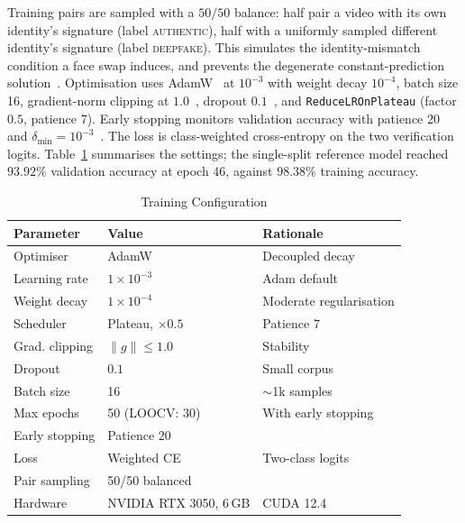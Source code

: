 \documentclass[journal]{IEEEtran}
\newcommand{\tabhead}[1]{\textbf{#1}}
\begin{document}
Training pairs are sampled with a $50/50$ balance: half pair a video with its
own identity's signature (label \textsc{authentic}), half with a uniformly
sampled different identity's signature (label \textsc{deepfake}). This
simulates the identity-mismatch condition a face swap induces, and prevents the
degenerate constant-prediction solution~\cite{facenet}. Optimisation uses
AdamW~\cite{adamw} at $10^{-3}$ with weight decay $10^{-4}$, batch size 16,
gradient-norm clipping at $1.0$~\cite{pascanu}, dropout
$0.1$~\cite{dropout}, and \texttt{ReduceLROnPlateau} (factor $0.5$, patience
7). Early stopping monitors validation accuracy with patience 20 and
$\delta_{\min} = 10^{-3}$~\cite{prechelt}. The loss is class-weighted
cross-entropy on the two verification logits. Table~\ref{tab:training}
summarises the settings; the single-split reference model reached $93.92\%$
validation accuracy at epoch 46, against $98.38\%$ training accuracy.

\begin{table}[!t]
\caption{Training Configuration}
\label{tab:training}
\centering
\footnotesize
\begin{tabular}{@{}lll@{}}
\toprule
\tabhead{Parameter} & \tabhead{Value} & \tabhead{Rationale} \\
\midrule
Optimiser        & AdamW                & Decoupled decay~\cite{adamw} \\
Learning rate    & $1\times10^{-3}$     & Adam default~\cite{adam} \\
Weight decay     & $1\times10^{-4}$     & Moderate regularisation \\
Scheduler        & Plateau, $\times0.5$ & Patience 7 \\
Grad. clipping   & $\lVert g \rVert \le 1.0$ & Stability~\cite{pascanu} \\
Dropout          & $0.1$                & Small corpus~\cite{dropout} \\
Batch size       & 16                   & $\sim$1k samples~\cite{masters_batch} \\
Max epochs       & 50 (LOOCV: 30)       & With early stopping \\
Early stopping   & Patience 20          & \cite{prechelt} \\
Loss             & Weighted CE          & Two-class logits \\
Pair sampling    & 50/50 balanced       & \cite{facenet} \\
Hardware         & NVIDIA RTX 3050, 6\,GB & CUDA 12.4 \\
\bottomrule
\end{tabular}
\end{table}
\end{document}
